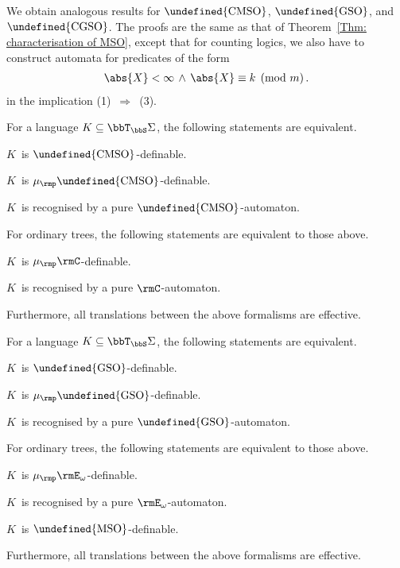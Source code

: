 \documentclass[10pt, fleqn]{scrartcl}
\makeatletter
\newcommand\m@thsm@ller[2]{\mbox{\relscale{0.91}$\m@th#1#2$}}
\let\smaller\undefined
\DeclareRobustCommand\smaller[1]{\relax\ifmmode{\mathpalette\m@thsm@ller{#1}}\else{\relscale{0.91}#1}\fi}
\newcommand*{\MSO}{\smaller{\mathrm{MSO}}}
\newcommand*{\GSO}{\smaller{\mathrm{GSO}}}
\newcommand*{\CMSO}{\smaller{\mathrm{CMSO}}}
\newcommand*{\CGSO}{\smaller{\mathrm{CGSO}}}
\newcommand*{\mup}{\mu_\rmp}
\newcommand*{\?}{\kern .08em}
\makeatother
\begin{document}
We obtain analogous results for $\CMSO$, $\GSO$, and $\CGSO$.
The proofs are the same as that of Theorem~\ref{Thm: characterisation of MSO}, except that
for counting logics, we also have to construct automata for predicates of the form
\begin{align*}
  \abs{X} < \infty \,\land\, \abs{X} \equiv k \pmod m\,.
\end{align*}
in the implication (1)~$\Rightarrow$~(3).
\begin{Thm}
For a language $K \subseteq \bbT_\bbS\Sigma$, the following statements are equivalent.
\begin{enum1}
\item $K$~is $\CMSO$-definable.
\item $K$~is $\mup\CMSO$-definable.
\item $K$~is recognised by a pure $\CMSO$-automaton.
\end{enum1}
For ordinary trees, the following statements are equivalent to those above.
\begin{enum1}[start=4]
\item $K$~is $\mup\rmC$-definable.
\item $K$~is recognised by a pure $\rmC$-automaton.
\end{enum1}
Furthermore, all translations between the above formalisms are effective.
\end{Thm}
\begin{Thm}
For a language $K \subseteq \bbT_\bbS\Sigma$, the following statements are equivalent.
\begin{enum1}
\item $K$~is $\GSO$-definable.
\item $K$~is $\mup\GSO$-definable.
\item $K$~is recognised by a pure $\GSO$-automaton.
\end{enum1}
For ordinary trees, the following statements are equivalent to those above.
\begin{enum1}[start=4]
\item $K$~is $\mup\rmE_\omega$-definable.
\item $K$~is recognised by a pure $\rmE_\omega$-automaton.
\item $K$~is $\MSO$-definable.
\end{enum1}
Furthermore, all translations between the above formalisms are effective.
\end{Thm}
\end{document}
